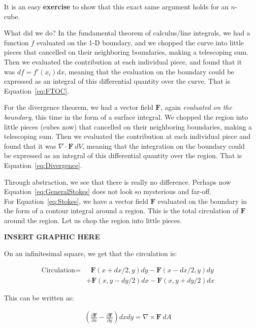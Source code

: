 \documentclass[../master.tex]{subfiles}
\begin{document}
	It is an easy \textbf{exercise} to show that this exact same argument holds for an $n$-cube. 
	
	What did we do? In the fundamental theorem of calculus/line integrals, we had a function $f$ evaluated on the 1-D boundary, and we chopped the curve into little pieces that cancelled on their neighboring boundaries, making a telescoping sum. Then we evaluated the contribution at each individual piece, and found that it was $df = f'(x_i) dx$, meaning that the evaluation on the boundary could be expressed as an integral of this differential quantity over the curve. That is Equation~\eqref{eq:FTOC}.
	
	For the divergence theorem, we had a vector field $\mathbf F$, again \emph{evaluated on the boundary}, this time in the form of a surface integral. We chopped the region into little pieces (cubes now) that cancelled on their neighboring boundaries, making a telescoping sum. Then we evaluated the contribution at each individual piece and found that it was $\nabla \cdot \mathbf F ~ dV$, meaning that the integration on the boundary could  be expressed as an integral of this differential quantity over the region. That is Equation~\eqref{eq:Divergence}.
	
	
	Through abstraction, we see that there is really no difference. Perhaps now Equation~\eqref{eq:GeneralStokes} does not look so mysterious and far-off.\\
	
	For Equation~\eqref{eq:Stokes}, we have a vector field $\mathbf F$ evaluated on the boundary in the form of a contour integral around a region. This is the total circulation of $\mathbf{F}$ around the region. Let us chop the region into little pieces. 
	
	\textbf{INSERT GRAPHIC HERE}
	
	On an infinitesimal square, we get that the circulation is:
	
	\begin{align*}
		\text{Circulation} =& ~~~  \mathbf F(x+dx/2,y) dy - \mathbf F(x-dx/2,y) dy \\ &+ \mathbf F(x,y-dy/2) dx - \mathbf F(x,y+dy/2) dx
	\end{align*}
	
	This can be written as:
	
	\begin{align*}
		\left( \frac{\partial \mathbf F}{\partial x} - \frac{\partial \mathbf F}{\partial y} \right) dx dy = \nabla \times \mathbf F ~ dA
	\end{align*}
	
\end{document}
